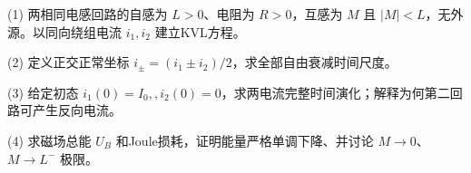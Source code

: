 (1) 两相同电感回路的自感为 \(L>0\)、电阻为 \(R>0\)，互感为 \(M\) 且 \(|M|<L\)，无外源。以同向绕组电流 \(i_1,i_2\) 建立KVL方程。

(2) 定义正交正常坐标 \(i_\pm=(i_1\pm i_2)/2\)，求全部自由衰减时间尺度。

(3) 给定初态 \(i_1(0)=I_0,,i_2(0)=0\)，求两电流完整时间演化；解释为何第二回路可产生反向电流。

(4) 求磁场总能 \(U_B\) 和Joule损耗，证明能量严格单调下降、并讨论 \(M\to0\)、\(M\to L^-\) 极限。
